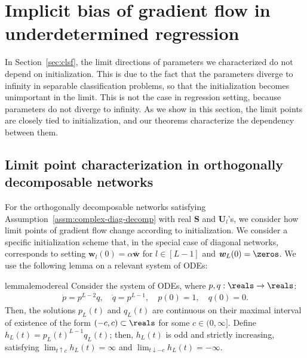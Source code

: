 \documentclass{article} %
\def\vw{{\bm{w}}}
\def\mS{{\bm{S}}}
\def\mU{{\bm{U}}}
\begin{document}
\section{Implicit bias of gradient flow in underdetermined regression}
In Section~\ref{sec:clsf}, the limit directions of parameters we characterized do not depend on initialization. This is due to the fact that the parameters diverge to infinity in separable classification problems, so that the initialization becomes unimportant in the limit.
This is not the case in regression setting, because parameters do not diverge to infinity. As we show in this section, the limit points are closely tied to initialization, and our theorems characterize the dependency between them.

\subsection{Limit point characterization in orthogonally decomposable networks}
\label{sec:meta-thms-reg}
For the orthogonally decomposable networks satisfying Assumption~\ref{assm:complex-diag-decomp} with real $\mS$ and $\mU_l$'s, we consider how limit points of gradient flow change according to initialization. We consider a specific initialization scheme that, in the special case of diagonal networks, corresponds to setting $\vw_l(0) = \alpha \bar \vw$ for $l \in [L-1]$ and $\vw_L(0) = \zeros$. We use the following lemma on a relevant system of ODEs:
\begin{restatable}{lemma}{lemodereal}
\label{lem:ode-real}
Consider the system of ODEs, where $p, q: \reals \to \reals$:
\begin{align*}
    \dot p = p^{L-2} q, \quad 
    \dot q = p^{L-1}, \quad
    p(0) = 1, \quad
    q(0) = 0.
\end{align*}
Then, the solutions $p_L(t)$ and $q_L(t)$ are continuous on their maximal interval of existence of the form $(-c,c) \subset \reals$ for some $c \in (0, \infty]$. %
Define $h_L(t) = p_L(t)^{L-1}q_L(t)$; then, $h_L(t)$ is odd and strictly increasing, satisfying $\lim_{t \uparrow c} h_L(t) = \infty$ and $\lim_{t \downarrow -c} h_L(t)= -\infty$.
\end{restatable}
\end{document}
